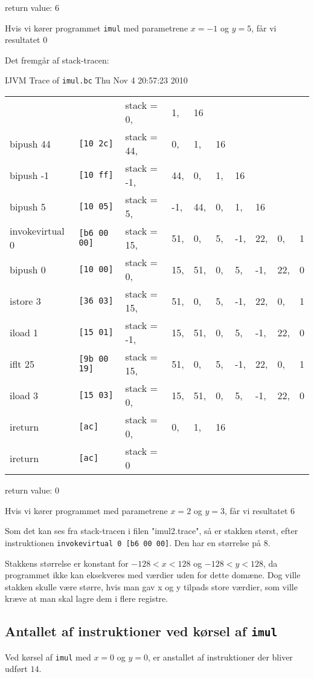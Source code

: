 \documentclass[12pt,a4paper]{article}
\newcommand{\imul}{\texttt{imul}}
\begin{document}
return value: 6

Hvis vi kører programmet \imul{} med parametrene $x=-1$ og $y=5$, får vi resultatet $0$

Det fremgår af stack-tracen:

IJVM Trace of \texttt{imul.bc} Thu Nov  4 20:57:23 2010

\begin{tabular}{llllllllll}
                &                    & stack = 0,& 1,& 16 \\
bipush 44       & \texttt{[10 2c]   }& stack = 44,& 0,& 1,& 16 \\
bipush -1       & \texttt{[10 ff]   }& stack = -1,& 44,& 0,& 1,& 16 \\
bipush 5        & \texttt{[10 05]   }& stack = 5,& -1,& 44,& 0,& 1,& 16 \\
invokevirtual 0 & \texttt{[b6 00 00]}& stack = 15,& 51,& 0,& 5,& -1,& 22,& 0,& 1 \\
bipush 0        & \texttt{[10 00]   }& stack = 0,& 15,& 51,& 0,& 5,& -1,& 22,& 0 \\
istore 3        & \texttt{[36 03]   }& stack = 15,& 51,& 0,& 5,& -1,& 22,& 0,& 1 \\
iload 1         & \texttt{[15 01]   }& stack = -1,& 15,& 51,& 0,& 5,& -1,& 22,& 0 \\
iflt 25         & \texttt{[9b 00 19]}& stack = 15,& 51,& 0,& 5,& -1,& 22,& 0,& 1 \\
iload 3         & \texttt{[15 03]   }& stack = 0,& 15,& 51,& 0,& 5,& -1,& 22,& 0 \\
ireturn         & \texttt{[ac]      }& stack = 0,& 0,& 1,& 16 \\
ireturn         & \texttt{[ac]      }& stack = 0
\end{tabular}

return value: $0$


Hvis vi kører programmet med parametrene $x=2$ og $y=3$, får vi resultatet $6$

Som det kan ses fra stack-tracen i filen "imul2.trace", så er stakken størst, efter instruktionen \texttt{invokevirtual 0 [b6 00 00]}. Den har en størrelse på $8$.

Stakkens størrelse er konstant for $-128 < x < 128$ og $-128 < y < 128$, da programmet ikke kan eksekveres med værdier uden for dette domæne. Dog ville stakken skulle være større, hvis man gav x og y tilpads store værdier, som ville kræve at man skal lagre dem i flere registre.

\subsection{Antallet af instruktioner ved kørsel af \imul{}}
Ved kørsel af \imul{} med $x=0$ og $y=0$, er anstallet af instruktioner der bliver udført $14$.
\end{document}
